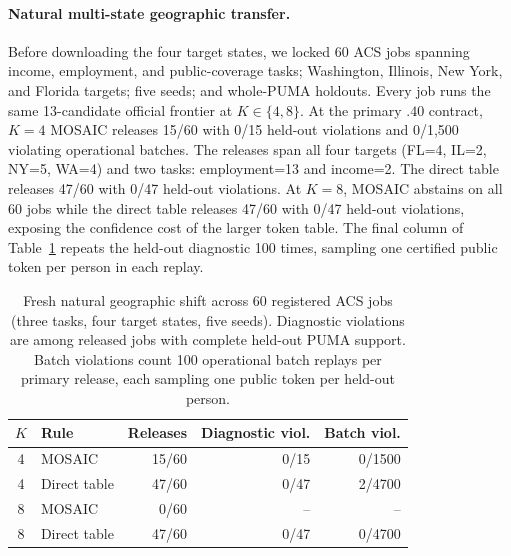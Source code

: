 \paragraph{Natural multi-state geographic transfer.}
Before downloading the four target states, we locked 60 ACS jobs spanning income, employment, and public-coverage tasks; Washington, Illinois, New York, and Florida targets; five seeds; and whole-PUMA holdouts. Every job runs the same 13-candidate official frontier at $K\in\{4,8\}$. At the primary $.40$ contract, $K=4$ MOSAIC releases 15/60 with 0/15 held-out violations and 0/1,500 violating operational batches. The releases span all four targets (FL=4, IL=2, NY=5, WA=4) and two tasks: employment=13 and income=2. The direct table releases 47/60 with 0/47 held-out violations. At $K=8$, MOSAIC abstains on all 60 jobs while the direct table releases 47/60 with 0/47 held-out violations, exposing the confidence cost of the larger token table. The final column of Table~\ref{tab:acs-natural-shift} repeats the held-out diagnostic 100 times, sampling one certified public token per person in each replay.

\begin{table}[t]
\centering
\scriptsize
\setlength{\tabcolsep}{3.5pt}
\begin{tabular}{clrrr}
\hline
$K$ & Rule & Releases & Diagnostic viol. & Batch viol. \\
\hline
4 & MOSAIC & 15/60 & 0/15 & 0/1500 \\
4 & Direct table & 47/60 & 0/47 & 2/4700 \\
8 & MOSAIC & 0/60 & -- & -- \\
8 & Direct table & 47/60 & 0/47 & 0/4700 \\
\hline
\end{tabular}
\caption{Fresh natural geographic shift across 60 registered ACS jobs (three tasks, four target states, five seeds). Diagnostic violations are among released jobs with complete held-out PUMA support. Batch violations count 100 operational batch replays per primary release, each sampling one public token per held-out person.}
\label{tab:acs-natural-shift}
\end{table}
